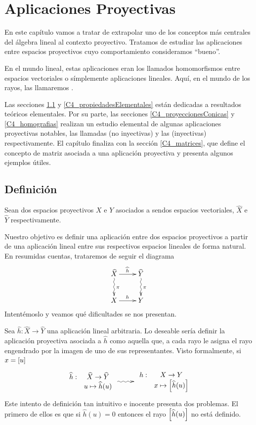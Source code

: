 \chapter{Aplicaciones Proyectivas}
\label{C4}
En este capítulo vamos a tratar de extrapolar uno de los conceptos más centrales del álgebra lineal al contexto proyectivo. Tratamos de estudiar las aplicaciones entre espacios proyectivos cuyo comportamiento consideramos ``bueno''.

En el mundo lineal, estas aplicaciones eran los llamados homomorfismos entre espacios vectoriales o símplemente aplicaciones lineales. Aquí, en el mundo de los rayos, las llamaremos .

Las secciones \ref{C4_definicion} y \ref{C4_propiedadesElementales} están dedicadas a resultados teóricos elementales. Por su parte, las secciones \ref{C4_proyeccionesConicas} y \ref{C4_homografias} realizan un estudio elemental de algunas aplicaciones proyectivas notables, las llamadas  (no inyectivas) y las  (inyectivas) respectivamente. El capítulo finaliza con la sección \ref{C4_matrices}, que define el concepto de matriz asociada a una aplicación proyectiva y presenta algunos ejemplos útiles.
\section{Definición}
\label{C4_definicion}
Sean dos espacios proyectivos $X$ e $Y$ asociados a sendos espacios vectoriales, $\widehat{X}$ e $\widehat{Y}$ respectivamente.

Nuestro objetivo es definir una aplicación entre dos espacios proyectivos a partir de una aplicación lineal entre sus respectivos espacios lineales de forma natural. En resumidas cuentas, trataremos de seguir el diagrama
\[\xymatrix{
	\widehat{X} \ar[r]^{\widehat{h}} \ar@{~>}[d]^{\pi}& \widehat{Y} \ar@{~>}[d]^{\pi}\\
	X \ar[r]^{h}& Y
}
\]
Intentémoslo y veamos qué dificultades se nos presentan.

Sea $\widehat{h}:\widehat{X}\to\widehat{Y}$ una aplicación lineal arbitraria. Lo deseable sería definir la aplicación proyectiva asociada a $\widehat{h}$ como aquella que, a cada rayo le asigna el rayo engendrado por la imagen de uno de sus representantes. Visto formalmente, si $x=\left [ u \right ]$
\[
\xymatrix{
{
\begin{array}{rc}
\widehat{h}:&\widehat{X}\to\widehat{Y}\\
&u\mapsto\widehat{h}(u)
\end{array}
}
\ar@{~>}[r]&
{
\begin{array}{rc}
h: & X\to Y\\
& x\mapsto\class{\widehat{h}(u)}
\end{array}
}
}
\]
Este intento de definición tan intuitivo e inocente presenta dos problemas. El primero de ellos es que si $\widehat{h}(u)=0$ entonces el rayo $\left [ \widehat{h}(u) \right ]$ no está definido.

